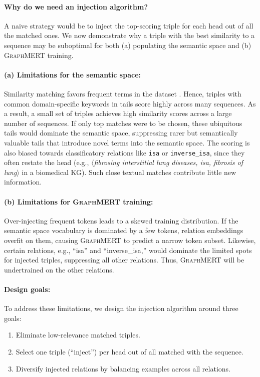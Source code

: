 \documentclass[10pt]{article}
\newcommand{\ours}{\textsc{GraphMERT}\xspace}
\begin{document}
\paragraph{Why do we need an injection algorithm?} A naive strategy would be to inject the top-scoring triple for each head out of all the matched ones. We now demonstrate why a triple with the best similarity to a sequence may be suboptimal for both (a) populating the semantic space and (b) \ours training.
\paragraph{(a) Limitations for the semantic space:}
Similarity matching favors frequent terms in the dataset \cite{zhou-etal-2022-problems}. Hence, triples with common domain-specific keywords in tails score highly across many sequences. As a result, a small set of triples achieves high similarity scores across a large number of sequences. If only top matches were to be chosen, these ubiquitous tails would dominate the semantic space, suppressing rarer but semantically valuable tails that introduce novel terms into the semantic space. The scoring is also biased towards classificatory relations like \texttt{isa} or \texttt{inverse\_isa}, since they often restate the head (e.g., \emph{$\langle$fibrosing interstitial lung diseases, isa, fibrosis of lung$\rangle$} in a biomedical KG). Such close textual matches contribute little new information.

\paragraph{(b) Limitations for \ours training:}
Over-injecting frequent tokens leads to a skewed training distribution. If the semantic space vocabulary is dominated by a few tokens, relation embeddings overfit on them, causing \ours to predict a narrow token subset. Likewise, certain relations, e.g., ``isa'' and ``inverse\_isa,'' would dominate the limited spots for injected triples, suppressing all other relations. Thus, \ours will be undertrained on the other relations.

\paragraph{Design goals:}  To address these limitations, we design the injection algorithm around three goals:
\begin{enumerate}
    \item Eliminate low-relevance matched triples.
    \item Select one triple (``inject'') per head out of all matched with the sequence.
    \item Diversify injected relations by balancing examples across all relations.
\end{enumerate}
\end{document}
